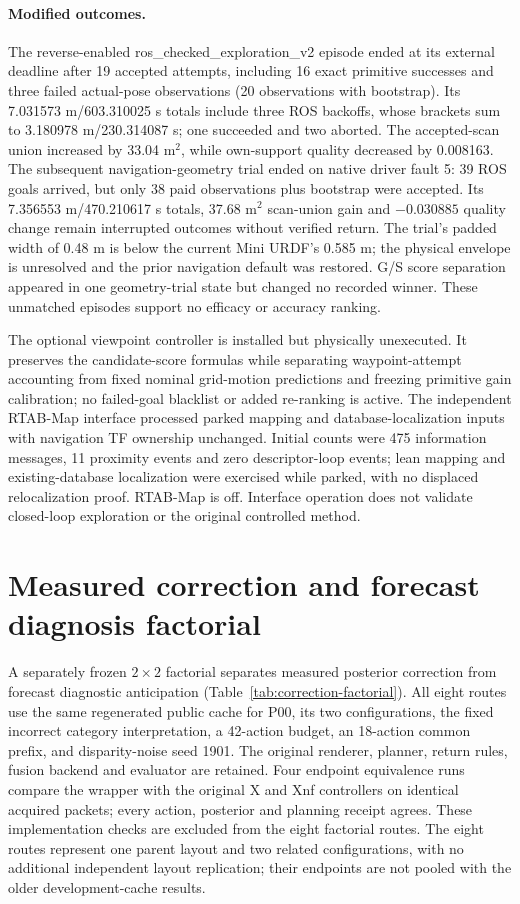 \documentclass[11pt,a4paper]{article}
\begin{document}
\paragraph{Modified outcomes.}
The reverse-enabled ros\_checked\_exploration\_v2 episode ended at its external deadline after 19 accepted attempts, including 16 exact primitive successes and three failed actual-pose observations (20 observations with bootstrap). Its 7.031573 m/603.310025 s totals include three ROS backoffs, whose brackets sum to 3.180978 m/230.314087 s; one succeeded and two aborted. The accepted-scan union increased by 33.04 m$^2$, while own-support quality decreased by 0.008163. The subsequent navigation-geometry trial ended on native driver fault 5: 39 ROS goals arrived, but only 38 paid observations plus bootstrap were accepted. Its 7.356553 m/470.210617 s totals, 37.68 m$^2$ scan-union gain and $-0.030885$ quality change remain interrupted outcomes without verified return. The trial's padded width of 0.48 m is below the current Mini URDF's 0.585 m; the physical envelope is unresolved and the prior navigation default was restored. G/S score separation appeared in one geometry-trial state but changed no recorded winner. These unmatched episodes support no efficacy or accuracy ranking.

The optional viewpoint controller is installed but physically unexecuted. It preserves the candidate-score formulas while separating waypoint-attempt accounting from fixed nominal grid-motion predictions and freezing primitive gain calibration; no failed-goal blacklist or added re-ranking is active. The independent RTAB-Map interface processed parked mapping and database-localization inputs with navigation TF ownership unchanged. Initial counts were 475 information messages, 11 proximity events and zero descriptor-loop events; lean mapping and existing-database localization were exercised while parked, with no displaced relocalization proof. RTAB-Map is off. Interface operation does not validate closed-loop exploration or the original controlled method.

\section{Measured correction and forecast diagnosis factorial}
A separately frozen $2\times2$ factorial separates measured posterior correction from forecast diagnostic anticipation (Table~\ref{tab:correction-factorial}). All eight routes use the same regenerated public cache for P00, its two configurations, the fixed incorrect category interpretation, a 42-action budget, an 18-action common prefix, and disparity-noise seed 1901. The original renderer, planner, return rules, fusion backend and evaluator are retained. Four endpoint equivalence runs compare the wrapper with the original X and Xnf controllers on identical acquired packets; every action, posterior and planning receipt agrees. These implementation checks are excluded from the eight factorial routes. The eight routes represent one parent layout and two related configurations, with no additional independent layout replication; their endpoints are not pooled with the older development-cache results.
\end{document}
